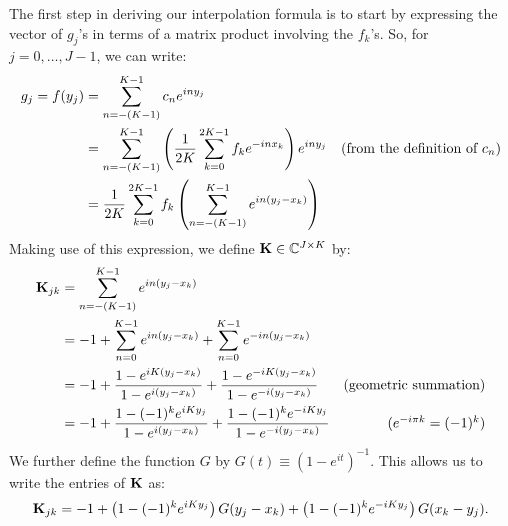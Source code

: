 The first step in deriving our interpolation formula is to
start by expressing the vector of $g_j$'s in terms of a matrix product
involving the $f_k$'s. So, for $j = 0, \hdots, J - 1$, we can write:
\begin{align*}
  g_j = f(y_j) &= \sum_{n=-(K-1)}^{K-1} c_n e^{iny_j} \\
  &= \sum_{n=-(K-1)}^{K-1} \left({1 \over 2K} \sum_{k=0}^{2K-1} f_k e^{-inx_k}\right) e^{iny_j} & \mbox{(from the definition of $c_n$)} \\
  &= {1 \over 2K} \sum_{k=0}^{2K-1} f_k \left(\sum_{n=-(K-1)}^{K-1} e^{in(y_j - x_k)}\right)
\end{align*}
Making use of this expression, we define $\bold{K} \in \mathbb{C}^{J \times K}$ by:
\begin{align*}
  \bold{K}_{jk} &= \sum_{n=-(K-1)}^{K-1} e^{in(y_j - x_k)} \\
  &= -1 + \sum_{n=0}^{K-1} e^{in(y_j - x_k)} + \sum_{n=0}^{K-1} e^{-in(y_j - x_k)} \\
  &= -1 + {1 - e^{iK(y_j - x_k)} \over 1 - e^{i(y_j - x_k)}} + {1 - e^{-iK(y_j - x_k)} \over 1 - e^{-i(y_j - x_k)}} & \mbox{(geometric summation)} \\
  &= -1 + {1 - (-1)^ke^{iKy_j} \over 1 - e^{i(y_j - x_k)}} + {1 - (-1)^ke^{-iKy_j} \over 1 - e^{-i(y_j - x_k)}} & \mbox{($e^{-i\pi k} = (-1)^k$)} \\
\end{align*}
We further define the function $G$ by $G(t) \equiv (1 -
e^{it})^{-1}$. This allows us to write the entries of $\bold{K}$ as:
\begin{align} \label{eqn:Kjk-in-terms-of-G-first-form}
  \bold{K}_{jk} = -1 + \left(1 - (-1)^ke^{iKy_j}\right) G(y_j - x_k) + \left(1 - (-1)^ke^{-iKy_j}\right) G(x_k - y_j).
\end{align}

